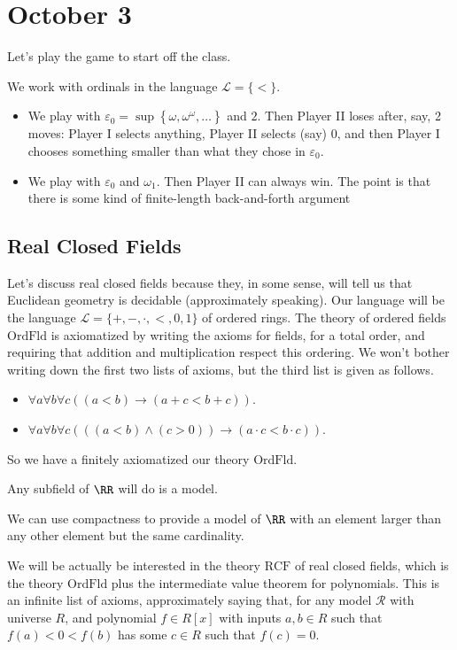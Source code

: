\documentclass[../notes.tex]{subfiles}
\begin{document}
\section{October 3}

Let's play the game to start off the class.
\begin{example}
	We work with ordinals in the language $\mathcal L=\{<\}$.
	\begin{itemize}
		\item We play with $\varepsilon_0=\sup\left\{\omega,\omega^\omega,\ldots\right\}$ and $2$. Then Player II loses after, say, 2 moves: Player I selects anything, Player II selects (say) $0$, and then Player I chooses something smaller than what they chose in $\varepsilon_0$.
		\item We play with $\varepsilon_0$ and $\omega_1$. Then Player II can always win. The point is that there is some kind of finite-length back-and-forth argument
	\end{itemize}
\end{example}

\subsection{Real Closed Fields}
Let's discuss real closed fields because they, in some sense, will tell us that Euclidean geometry is decidable (approximately speaking). Our language will be the language $\mathcal L=\{+,-,\cdot,<,0,1\}$ of ordered rings. The theory of ordered fields $\mathrm{OrdFld}$ is axiomatized by writing the axioms for fields, for a total order, and requiring that addition and multiplication respect this ordering. We won't bother writing down the first two lists of axioms, but the third list is given as follows.
\begin{itemize}
	\item $\forall a\forall b\forall c((a<b)\to (a+c<b+c))$.
	\item $\forall a\forall b\forall c(((a<b)\land(c>0))\to (a\cdot c<b\cdot c))$.
\end{itemize}
So we have a finitely axiomatized our theory $\mathrm{OrdFld}$.
\begin{example}
	Any subfield of $\RR$ will do is a model.
\end{example}
\begin{example}
	We can use compactness to provide a model of $\RR$ with an element larger than any other element but the same cardinality.
\end{example}
We will be actually be interested in the theory $\mathrm{RCF}$ of real closed fields, which is the theory $\mathrm{OrdFld}$ plus the intermediate value theorem for polynomials. This is an infinite list of axioms, approximately saying that, for any model $\mathcal R$ with universe $R$, and polynomial $f\in R[x]$ with inputs $a,b\in R$ such that $f(a)<0<f(b)$ has some $c\in R$ such that $f(c)=0$.
\end{document}
